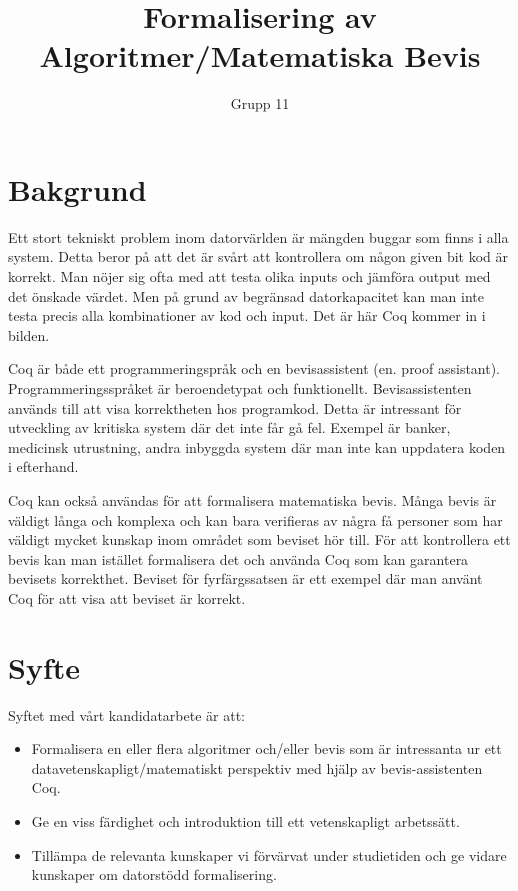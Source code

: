 \documentclass[a4paper]{article}
\author{Grupp 11}
\title{Formalisering av Algoritmer/Matematiska Bevis}
\begin{document}
\maketitle
\thispagestyle{empty}
\newpage

\section*{Bakgrund}

Ett stort tekniskt problem inom datorvärlden är mängden buggar som finns i alla
system. Detta beror på att det är svårt att kontrollera om någon given bit kod
är korrekt. Man nöjer sig ofta med att testa olika inputs och jämföra output
med det önskade värdet. Men på grund av begränsad datorkapacitet kan man inte
testa precis alla kombinationer av kod och input. Det är här Coq kommer in i
bilden.

Coq är både ett programmeringspråk och en bevisassistent (en. proof assistant).
Programmeringsspråket är beroendetypat och funktionellt. Bevisassistenten
används till att visa korrektheten hos programkod. Detta är intressant för
utveckling av kritiska system där det inte får gå fel. Exempel är banker,
medicinsk utrustning, andra inbyggda system där man inte kan uppdatera koden i
efterhand.

Coq kan också användas för att formalisera matematiska bevis. Många bevis är
väldigt långa och komplexa och kan bara verifieras av några få personer som har
väldigt mycket kunskap inom området som beviset hör till. För att kontrollera
ett bevis kan man istället formalisera det och använda Coq som kan garantera
bevisets korrekthet. Beviset för fyrfärgssatsen är ett exempel där man använt
Coq för att visa att beviset är korrekt.

\section*{Syfte}

Syftet med vårt kandidatarbete är att:

\begin{itemize}
  \item Formalisera en eller flera algoritmer och/eller bevis som är
    intressanta ur ett datavetenskapligt/matematiskt perspektiv med hjälp av
    bevis-assistenten Coq.
  \item Ge en viss färdighet och introduktion till ett vetenskapligt
    arbetssätt.
  \item Tillämpa de relevanta kunskaper vi förvärvat under studietiden och ge
    vidare kunskaper om datorstödd formalisering.
\end{itemize}
\end{document}
